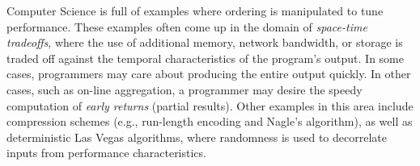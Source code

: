 Computer Science is full of examples where ordering is manipulated to tune performance.  These
examples often come up in the domain of {\em space-time tradeoffs}, where the use of additional
memory, network bandwidth, or storage is traded off against the temporal characteristics of the
program's output.  In some cases, programmers may care about producing the entire output quickly.
In other cases, such as on-line aggregation, a programmer may desire the speedy computation of
{\em early returns} (partial results).  Other examples in this area include compression schemes
(e.g., run-length encoding and Nagle's algorithm), as well as deterministic Las Vegas algorithms,
where randomness is used to decorrelate inputs from performance characteristics.
